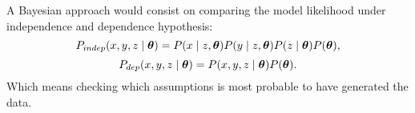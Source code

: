 A Bayesian approach would consist on comparing the model likelihood under independence and dependence hypothesis:
\[
  P_{indep}(x,y,z \mid \bm{\theta}) = P(x\mid z, \bm{\theta})P(y \mid z, \bm{\theta})P(z \mid \bm{\theta})P(\bm{\theta}),
\]
\[
P_{dep}(x,y,z \mid \bm{\theta}) = P(x,y,z \mid \bm{\theta})P(\bm{\theta}).
\]
Which means checking which assumptions is most probable to have generated the data.

